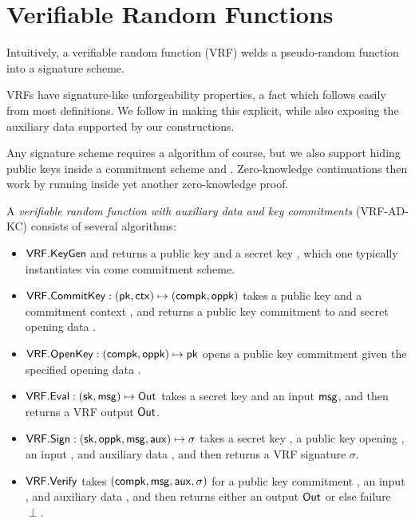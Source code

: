 
\section{Verifiable Random Functions}
\label{sec:vrf}

Intuitively, a verifiable random function (VRF) welds a pseudo-random function into a signature scheme.

VRFs have signature-like unforgeability properties, a fact which follows easily from most definitions. 
We follow \cite{agg_dkg} in making this explicit, while also
 exposing the auxiliary data supported by our constructions. 

Any signature scheme requires a \KeyGen algorithm of course, but we also
support hiding public keys inside a commitment scheme \CommitKey and \OpenKey.
Zero-knowledge continuations then work by running \OpenKey inside yet
another zero-knowledge proof. 

\begin{definition}
A {\em verifiable random function with auxiliary data and key commitments} (VRF-AD-KC) consists of several algorithms:
\begin{itemize}
\item ${\mathsf{VRF}}.{\mathsf{KeyGen}}$ and returns a public key \pk and a secret key \sk, which one typically instantiates via come commitment scheme. 
%
\item ${\mathsf{VRF}}.{\mathsf{CommitKey}} : (\mathsf{pk},\mathsf{ctx}) \mapsto (\mathsf{compk},\mathsf{oppk})$ takes a public key \pk and a commitment context \ctx, and returns a public key commitment \compk to \sk and secret opening data \openpk.
\item ${\mathsf{VRF}}.{\mathsf{OpenKey}} : (\mathsf{compk},\mathsf{oppk}) \mapsto \mathsf{pk}$ opens a public key commitment \compk given the specified opening data \openpk.
%
\item ${\mathsf{VRF}}.{\mathsf{Eval}} : (\mathsf{sk},\mathsf{msg}) \mapsto {\ensuremath{\mathsf{Out}}}$ takes a secret key \sk and an input $\mathsf{msg}$, and then returns a VRF output ${\mathsf{Out}}$.
\item ${\mathsf{VRF}}.{\mathsf{Sign}} : (\mathsf{sk},\mathsf{oppk},\mathsf{msg},\mathsf{aux}) \mapsto \sigma$ takes a secret key \sk, a public key opening \openpk, an input \msg, and auxiliary data \aux, and then returns a VRF signature $\sigma$.
\item ${\mathsf{VRF}}.{\mathsf{Verify}}$ takes $(\mathsf{compk},\mathsf{msg},\mathsf{aux},\sigma)$ for a public key commitment \compk, an input \msg, and auxiliary data \aux, and then returns either an output ${\mathsf{Out}}$ or else failure $\perp$.
\end{itemize}
\end{definition}

